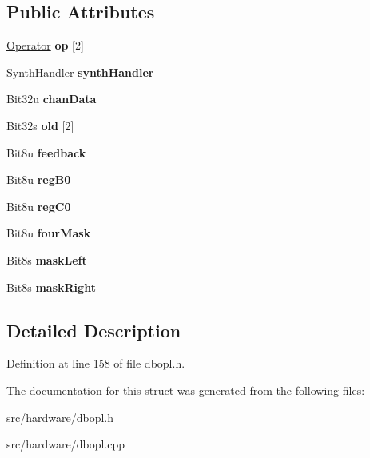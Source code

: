\subsection*{Public Attributes}
\begin{DoxyCompactItemize}
\item 
\hypertarget{structDBOPL_1_1Channel_aa5bb1c90f84d9b8a04f4c4110bedb169}{\hyperlink{structDBOPL_1_1Operator}{Operator} {\bfseries op} \mbox{[}2\mbox{]}}\label{structDBOPL_1_1Channel_aa5bb1c90f84d9b8a04f4c4110bedb169}

\item 
\hypertarget{structDBOPL_1_1Channel_a266d0cc54c93cf0a8fb7d766adbdcb0a}{Synth\-Handler {\bfseries synth\-Handler}}\label{structDBOPL_1_1Channel_a266d0cc54c93cf0a8fb7d766adbdcb0a}

\item 
\hypertarget{structDBOPL_1_1Channel_ad91510284ef6e6b40a01d740ae005c26}{Bit32u {\bfseries chan\-Data}}\label{structDBOPL_1_1Channel_ad91510284ef6e6b40a01d740ae005c26}

\item 
\hypertarget{structDBOPL_1_1Channel_a19de035abb6b4208b4495db8748953b1}{Bit32s {\bfseries old} \mbox{[}2\mbox{]}}\label{structDBOPL_1_1Channel_a19de035abb6b4208b4495db8748953b1}

\item 
\hypertarget{structDBOPL_1_1Channel_a8f0785435bc4dc242e31ef7189c6c820}{Bit8u {\bfseries feedback}}\label{structDBOPL_1_1Channel_a8f0785435bc4dc242e31ef7189c6c820}

\item 
\hypertarget{structDBOPL_1_1Channel_ab3dc5ec924ed7f45eaec874a6b832b65}{Bit8u {\bfseries reg\-B0}}\label{structDBOPL_1_1Channel_ab3dc5ec924ed7f45eaec874a6b832b65}

\item 
\hypertarget{structDBOPL_1_1Channel_a8d7eb26618827a6f411b2eed17d47198}{Bit8u {\bfseries reg\-C0}}\label{structDBOPL_1_1Channel_a8d7eb26618827a6f411b2eed17d47198}

\item 
\hypertarget{structDBOPL_1_1Channel_a42935dfe22c169e87d2bc07d0735c70b}{Bit8u {\bfseries four\-Mask}}\label{structDBOPL_1_1Channel_a42935dfe22c169e87d2bc07d0735c70b}

\item 
\hypertarget{structDBOPL_1_1Channel_ab526018f8396bed2335abbdb2829e133}{Bit8s {\bfseries mask\-Left}}\label{structDBOPL_1_1Channel_ab526018f8396bed2335abbdb2829e133}

\item 
\hypertarget{structDBOPL_1_1Channel_a79e6d8a988d547a71ebd48097172f121}{Bit8s {\bfseries mask\-Right}}\label{structDBOPL_1_1Channel_a79e6d8a988d547a71ebd48097172f121}

\end{DoxyCompactItemize}


\subsection{Detailed Description}


Definition at line 158 of file dbopl.\-h.



The documentation for this struct was generated from the following files\-:\begin{DoxyCompactItemize}
\item 
src/hardware/dbopl.\-h\item 
src/hardware/dbopl.\-cpp\end{DoxyCompactItemize}

